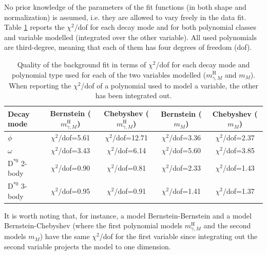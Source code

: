 No prior knowledge of the parameters of the fit functions (in both shape and normalization) is assumed, i.e. they are allowed to vary freely in the data fit. Table \ref{tab:bkg_polynomials} reports the $\chi^2$/dof for each decay mode and for both polynomial classes and variable modelled (integrated over the other variable). All used polynomials are third-degree, meaning that each of them has four degrees of freedom (dof).
\begin{table}[!ht]
    \centering
    \begin{tabular}{|l|c|c|c|c|}
        \hline
        \cellcolor{lightgray}Decay mode & \cellcolor{lightgray}Bernstein ($m^{\text{H}}_{\gamma, M}$) & \cellcolor{lightgray}Chebyshev ($m^{\text{H}}_{\gamma, M}$)   & \cellcolor{lightgray}Bernstein ($m_{M}$) & \cellcolor{lightgray}Chebyshev ($m_{M}$)\\ \hline
        $\phi$                  &$\chi^2$/dof=5.61   &$\chi^2$/dof=12.71    &$\chi^2$/dof=3.36   &$\chi^2$/dof=2.37   \\
        $\omega$                &$\chi^2$/dof=3.43   &$\chi^2$/dof=6.14     &$\chi^2$/dof=5.60   &$\chi^2$/dof=3.85   \\
        $\text{D}^{*0}$ 2-body  &$\chi^2$/dof=0.90   &$\chi^2$/dof=0.81     &$\chi^2$/dof=2.33   &$\chi^2$/dof=1.43   \\
        $\text{D}^{*0}$ 3-body  &$\chi^2$/dof=0.95   &$\chi^2$/dof=0.91     &$\chi^2$/dof=1.41   &$\chi^2$/dof=1.37   \\
        \hline
        \end{tabular}
    \caption{Quality of the background fit in terms of $\chi^2$/dof for each decay mode and polynomial type used for each of the two variables modelled ($m^{\text{H}}_{\gamma, M}$ and $m_{M}$). When reporting the $\chi^2$/dof of a polynomial used to model a variable, the other has been integrated out.}
    \label{tab:bkg_polynomials}
\end{table}


It is worth noting that, for instance, a model Bernstein-Bernstein and a model Bernstein-Chebyshev (where the first polynomial models $m^{\text{H}}_{\gamma, M}$ and the second models $m_{M}$) have the same $\chi^2$/dof for the first variable since integrating out the second variable projects the model to one dimension.

